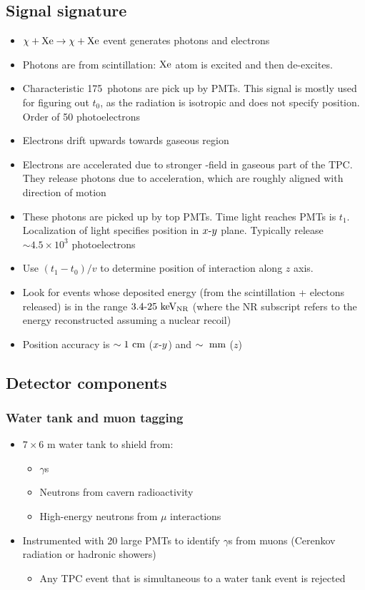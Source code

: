 \subsection{Signal signature}
\begin{itemize}
  \item $\chi+\text{Xe}\rightarrow \chi+\text{Xe}$ event generates photons and electrons
  \item Photons are from scintillation: $\text{Xe}$ atom is excited and then de-excites. 
  \item Characteristic 175~\nm photons are pick up by PMTs. This signal is mostly used for figuring out $t_0$, as the radiation is isotropic and does not specify position. Order of 50 photoelectrons
  \item Electrons drift upwards towards gaseous region
  \item Electrons are accelerated due to stronger \E-field in gaseous part of the TPC. They release photons due to acceleration, which are roughly aligned with direction of motion
  \item These photons are picked up by top PMTs. Time light reaches PMTs is $t_1$. Localization of light specifies position in $x\textto y$ plane. Typically release $\sim4.5\times 10^3$ photoelectrons
  \item Use $(t_1-t_0)/v$ to determine position of interaction along $z$ axis.
  \item Look for events whose deposited energy (from the scintillation + electons released) is in the range $3.4\textto25~\kev_\text{NR}$ (where the NR subscript refers to the energy reconstructed assuming a nuclear recoil)
  \item Position accuracy is $\sim 1~\text{cm}$ ($x\textto y$) and $\sim~\text{mm}$ ($z$)
\end{itemize}

\subsection{Detector components}
\subsubsection{Water tank and muon tagging}
\begin{itemize}
  \item $7\times 6$ m water tank to shield from:
  \begin{itemize}
    \item $\gamma$s
    \item Neutrons from cavern radioactivity
    \item High-energy neutrons from $\mu$ interactions
  \end{itemize}
  \item Instrumented with 20 large PMTs to identify $\gamma$s from muons (Cerenkov radiation or hadronic showers)
  \begin{itemize}
    \item Any TPC event that is simultaneous to a water tank event is rejected
  \end{itemize}
\end{itemize}

